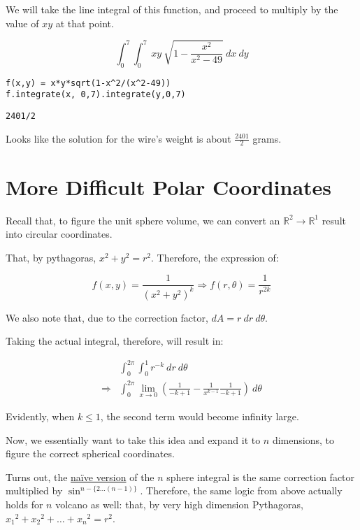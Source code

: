 \documentclass[letterpaper]{article}
\begin{document}
We will take the line integral of this function, and proceed to multiply by the value of \(xy\) at that point.

\begin{equation}
   \int_0^7 \int_0^7\ xy\ \sqrt{1-\frac{x^2}{x^2-49}}\ dx\ dy
\end{equation}

\begin{verbatim}
f(x,y) = x*y*sqrt(1-x^2/(x^2-49))
f.integrate(x, 0,7).integrate(y,0,7)
\end{verbatim}

\begin{verbatim}
2401/2
\end{verbatim}


Looks like the solution for the wire's weight is about \(\frac{2401}{2}\) grams.

\section{More Difficult Polar Coordinates}
\label{sec:org3c25cf7}
Recall that, to figure the unit sphere volume, we can convert an \(\mathbb{R}^2\to\mathbb{R}^1\) result into circular coordinates.

That, by pythagoras, \(x^2+y^2=r^2\). Therefore, the expression of:

\begin{equation}
   f(x,y) = \frac{1}{(x^2+y^2)^k} \Rightarrow f(r,\theta) = \frac{1}{r^{2k}}
\end{equation}

We also note that, due to the correction factor, \(dA = r\ dr\ d\theta\).

Taking the actual integral, therefore, will result in:

\begin{align}
&\int_0^{2\pi} \int_0^1 r^{-k}\ dr\ d\theta\\
\Rightarrow &\int_0^{2\pi} \lim_{x\to 0} \left(\frac{1}{-k+1}-\frac{1}{x^{k-1}}\frac{1}{-k+1}\right)\ d\theta
\end{align}

Evidently, when \(k\leq 1\), the second term would become infinity large.

Now, we essentially want to take this idea and expand it to \(n\) dimensions, to figure the correct spherical coordinates.

Turns out, the \href{https://math.stackexchange.com/questions/1482747/integral-in-n-dimensional-spherical-coordinates}{naïve version} of the \(n\) sphere integral is the same correction factor multiplied by \(\sin^{n-\{2\ldots(n-1)\}}\). Therefore, the same logic from above actually holds for \(n\) volcano as well: that, by very high dimension Pythagoras, \({x_1}^2 + {x_2}^2 + \ldots + {x_n}^2 = r^2\).
\end{document}
